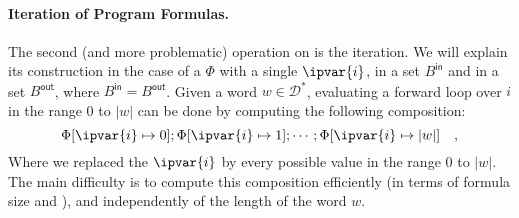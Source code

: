 \paragraph{Iteration of Program Formulas.} The second (and more problematic)
operation on  is the iteration. We will explain its
construction in the case of a  $\Phi$ with a single
 $\ipvar{i}$,  in a set
$B^{\mathsf{in}}$ and  in a set
$B^{\mathsf{out}}$, where $B^{\mathsf{in}} = B^{\mathsf{out}}$. Given a word $w \in \mathcal{D}^*$, evaluating a forward
loop over $i$ in the range $0$ to $|w|$ can be done by computing the following
composition: 
\begin{equation}
    \label{eq:iteration-dumb}
    \Phi[\ipvar{i} \mapsto 0] ; \Phi[\ipvar{i} \mapsto 1] ; \cdots ;
    \Phi[\ipvar{i} \mapsto |w|] \quad ,
\end{equation}
Where we replaced the 
$\ipvar{i}$ by every possible value in the range $0$ to $|w|$. The main
difficulty is to compute this composition efficiently (in terms of formula size and 
), and independently of the
length of the word $w$.

